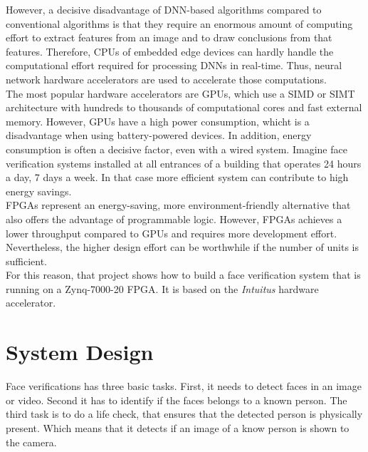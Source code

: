 \documentclass[%
a4paper,
twoside,
openany,
dvipsnames
]
{report}
\begin{document}
	However, a decisive disadvantage of \gls{DNN}-based algorithms compared to conventional algorithms is that they require an enormous amount of computing effort to extract features from an image and to draw conclusions from that features. Therefore, \glspl{CPU} of embedded edge devices can hardly handle the computational effort required for processing \glspl{DNN} in real-time. Thus, neural network hardware accelerators are used to accelerate those computations.\\ 
	The most popular hardware accelerators are \glspl{GPU}, which use a \gls{SIMD} or \gls{SIMT} architecture with hundreds to thousands of computational cores and fast external memory. However, \glspl{GPU} have a high power consumption, whicht is a disadvantage when using battery-powered devices. In addition, energy consumption is often a decisive factor, even with a wired system. Imagine face verification systems installed at all entrances of a building that operates 24 hours a day, 7 days a week. In that case more efficient system can contribute to high energy savings.\\
	\Glspl{FPGA} represent an energy-saving, more environment-friendly alternative that also offers the advantage of programmable logic. However, \glspl{FPGA} achieves a lower throughput compared to \glspl{GPU} and requires more development effort. Nevertheless, the higher design effort can be worthwhile if the number of units is sufficient.\\
	For this reason, that project shows how to build a face verification system that is running on a Zynq-7000-20 \gls{FPGA}. It is based on the \textit{Intuitus} hardware accelerator.    
	\chapter{System Design}
	Face verifications has three basic tasks. First, it needs to detect faces in an image or video. Second it has to identify if the faces belongs to a known person. The third task is to do a life check, that ensures that the detected person is physically present. Which means that it detects if an image of a know person is shown to the camera. \\
\end{document}
